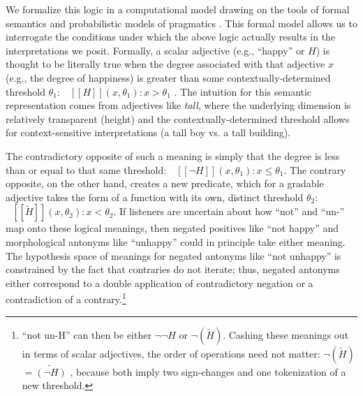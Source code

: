 \documentclass[floatsintext,doc]{apa6}
\let\rmarkdownfootnote\footnote%
\def\footnote{\protect\rmarkdownfootnote}
\begin{document}
We formalize this logic in a computational model drawing on the tools of formal semantics and probabilistic models of pragmatics \cite{Franke2015a, Goodman2016:RSA}. 
This formal model allows us to interrogate the conditions under which the above logic actually results in the interpretations we posit.
Formally, a scalar adjective (e.g., \enquote{happy} or $H$) is thought to be literally true when the degree associated with that adjective \(x\) (e.g., the degree of happiness) is greater than some contextually-determined threshold \(\theta_1\): \(\mbox{ $[\![H]\!]$}(x, \theta_1): x > \theta_1\) \cite{Kennedy2007}.
The intuition for this semantic representation comes from adjectives like \emph{tall}, where the underlying dimension is relatively transparent (height) and the contextually-determined threshold allows for context-sensitive interpretations (a tall boy vs. a tall building).

The contradictory opposite of such a meaning is simply that the degree is less than or equal to that same threshold: \( \mbox{ $[\![\neg H]\!]$}(x, \theta_1): x \leq \theta_1\).
The contrary opposite, on the other hand, creates a new predicate, which for a gradable adjective takes the form of a function with its own, distinct threshold \(\theta_2\): \(\mbox{ $[\![ \tilde{H} ]\!]$}(x, \theta_2): x < \theta_2\).
If listeners are uncertain about how \enquote{not} and \enquote{un-} map onto these logical meanings, then negated positives like \enquote{not happy} and morphological antonyms like \enquote{unhappy} could in principle take either meaning. 
The hypothesis space of meanings for negated antonyms like \enquote{not unhappy} is constrained by the fact that contraries do not iterate; thus, negated antonyms either correspond to a double application of contradictory negation or a contradiction of a contrary.\footnote{``not un-H'' can then be either \(\neg \neg H\) or \(\neg (\tilde{H})\). Cashing these meanings out in terms of scalar adjectives, the order of operations need not matter: \(\neg (\tilde{H})\) $= \tilde{(\neg H)}$ , because both imply two sign-changes and one tokenization of a new threshold.}
\end{document}
